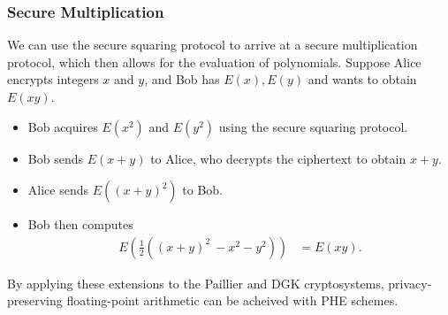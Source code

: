 \subsubsection{Secure Multiplication}
We can use the secure squaring protocol to arrive at a secure multiplication protocol, which then allows for the evaluation of polynomials.
Suppose Alice encrypts integers $x$ and $y$, and Bob has $E\left(x\right), E\left(y\right)$ and wants to obtain $E\left(xy\right)$.
\begin{itemize}
	\item Bob acquires $E\left(x^2\right)$ and $E\left(y^2\right)$ using the secure squaring protocol.
	\item Bob sends $E\left(x+y\right)$ to Alice, who decrypts the ciphertext to obtain $x+y$.
	\item Alice sends $E\left(\left(x+y\right)^2\right)$ to Bob.
	\item Bob then computes
	\begin{align*}
		E\left(\frac{1}{2}\left(\left(x+y\right)^2\ - x^2 - y^2\right)\right) 
		&= E\left(xy\right).
	\end{align*}
\end{itemize}

By applying these extensions to the Paillier and DGK cryptosystems, privacy-preserving floating-point arithmetic can be acheived with PHE schemes. 
